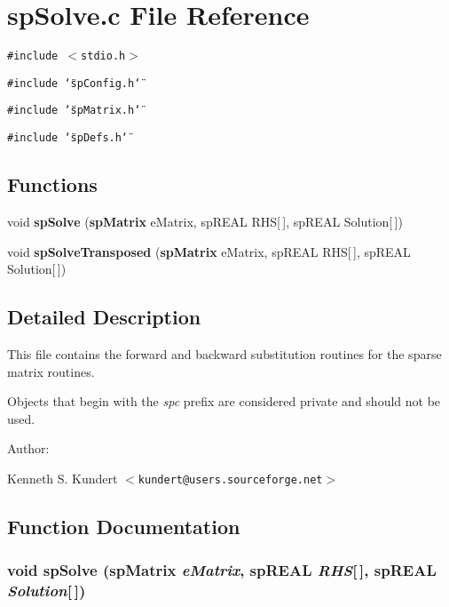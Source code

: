 \section{sp\-Solve.c File Reference}
\label{spSolve_8c}
{\tt \#include $<$stdio.h$>$}\par
{\tt \#include \char`\"{}sp\-Config.h\char`\"{}}\par
{\tt \#include \char`\"{}sp\-Matrix.h\char`\"{}}\par
{\tt \#include \char`\"{}sp\-Defs.h\char`\"{}}\par
\subsection*{Functions}
\begin{CompactItemize}
\item 
void {\bf sp\-Solve} ({\bf sp\-Matrix} e\-Matrix, sp\-REAL RHS[$\,$], sp\-REAL Solution[$\,$])
\item 
void {\bf sp\-Solve\-Transposed} ({\bf sp\-Matrix} e\-Matrix, sp\-REAL RHS[$\,$], sp\-REAL Solution[$\,$])
\end{CompactItemize}


\subsection{Detailed Description}
 This file contains the forward and backward substitution routines for the sparse matrix routines.

Objects that begin with the {\em spc} prefix are considered private and should not be used.

\begin{Desc}
\item[Author: ]\par
 Kenneth S. Kundert $<${\tt kundert@users.sourceforge.net}$>$\end{Desc}


\subsection{Function Documentation}
\subsubsection{\setlength{\rightskip}{0pt plus 5cm}void sp\-Solve ({\bf sp\-Matrix} {\em e\-Matrix}, sp\-REAL {\em RHS}[$\,$], sp\-REAL {\em Solution}[$\,$])}\label{spSolve_8c_a5}


